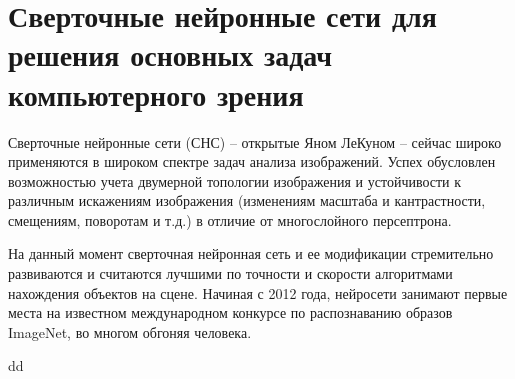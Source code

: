 \section{Сверточные нейронные сети для решения основных задач компьютерного зрения}

Сверточные нейронные сети (СНС) -- открытые Яном ЛеКуном -- сейчас широко применяются в широком спектре задач анализа изображений. Успех обусловлен возможностью учета двумерной топологии изображения и устойчивости к различным искажениям изображения (изменениям масштаба и кантрастности, смещениям, поворотам и т.д.) в отличие от многослойного персептрона.

На данный момент сверточная нейронная сеть и ее модификации стремительно развиваются и считаются лучшими по точности и скорости алгоритмами нахождения объектов на сцене. Начиная с 2012 года, нейросети занимают первые места на известном международном конкурсе по распознаванию образов ImageNet, во многом обгоняя человека.

dd

\clearpage